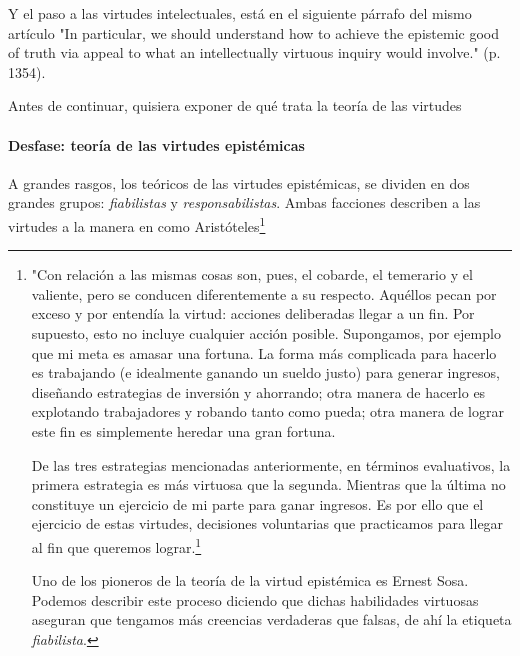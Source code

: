 {{{Y el paso a las virtudes intelectuales, está en el siguiente párrafo del mismo artículo "In particular, we should understand how to achieve the epistemic good of truth via appeal to what an intellectually virtuous inquiry would involve." (p. 1354).

Antes de continuar, quisiera exponer de qué trata la teoría de las virtudes %

\paragraph{Desfase: teoría de las virtudes epistémicas}

A grandes rasgos, los teóricos de las virtudes epistémicas, se dividen en dos grandes grupos: \emph{fiabilistas} y \emph{responsabilistas}.
Ambas facciones describen a las virtudes a la manera en como Aristóteles\footnote{"Con relación a las mismas cosas son, pues, el cobarde, el temerario y el valiente, pero se conducen diferentemente a su respecto. Aquéllos pecan por exceso y por %
entendía la virtud: acciones deliberadas llegar a un fin.
Por supuesto, esto no incluye cualquier acción posible.
Supongamos, por ejemplo que mi meta es amasar una fortuna.
La forma más complicada para hacerlo es trabajando (e idealmente ganando un sueldo justo) para generar ingresos, diseñando estrategias de inversión y ahorrando; otra manera de hacerlo es explotando trabajadores y robando tanto como pueda; otra manera de lograr este fin es simplemente heredar una gran fortuna.

De las tres estrategias mencionadas anteriormente, en términos evaluativos, la primera estrategia es más virtuosa que la segunda.
Mientras que la última no constituye un ejercicio de mi parte para ganar ingresos.
Es por ello que el ejercicio de estas virtudes, decisiones voluntarias que practicamos para llegar al fin que queremos lograr.\footnote{Es controvertido señalar exactamente cuál es el \emph{telos} de nuestras empresas epistémicas. En particular el fin de la investigación o de la indagación. Varios candidatos entran en esta canasta: la verdad, la comprensión, etc. Por ahora dejaré de lado este problema, pero el trabajo de Friedman puede ofrecer una respuesta para esto.}

Uno de los pioneros de la teoría de la virtud epistémica es Ernest Sosa.
Podemos describir este proceso diciendo que dichas habilidades virtuosas aseguran que tengamos más creencias verdaderas que falsas, de ahí la etiqueta \emph{fiabilista}.

}}}}
